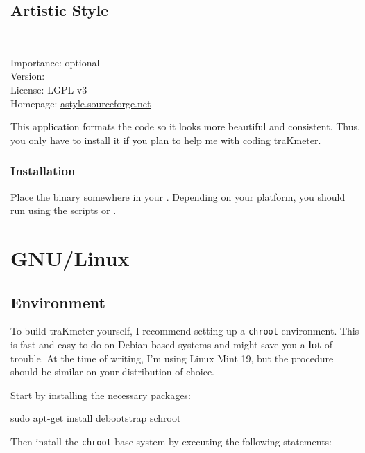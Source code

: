 \subsection{Artistic Style}

\begin{tabbing}
  \hspace*{6em}\=\=\kill

  Importance:  \> optional \\
  Version:      \\
  License:     \> LGPL v3 \\
  Homepage:    \> \href{http://astyle.sourceforge.net/}{astyle.sourceforge.net}
\end{tabbing}

This application formats the code so it looks more beautiful and
consistent.  Thus, you only have to install it if you plan to help me
with coding traKmeter.

\subsubsection{Installation}

Place the binary somewhere in your .  Depending on your
platform, you should run  using the scripts
 or .

\newpage %

\section{GNU/Linux}

\subsection{Environment}

To build traKmeter yourself, I recommend setting up a \texttt{chroot}
environment.  This is fast and easy to do on Debian-based systems and
might save you a \textbf{lot} of trouble.  At the time of writing, I'm
using Linux Mint 19, but the procedure should be similar on your
distribution of choice.

Start by installing the necessary packages:

\begin{VerbatimBoth}
  sudo apt-get install debootstrap schroot
\end{VerbatimBoth}

Then install the \texttt{chroot} base system by executing the
following statements:

